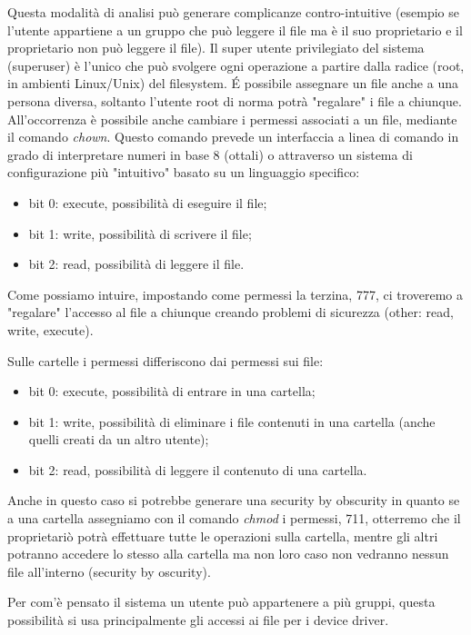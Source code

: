 Questa modalità di analisi può generare complicanze contro-intuitive (esempio se l’utente appartiene a un gruppo che può leggere il file ma è il suo proprietario e il proprietario non può leggere il file).
Il super utente privilegiato del sistema (superuser) è l'unico che può svolgere ogni operazione a partire dalla radice (root, in ambienti Linux/Unix) del filesystem.
\'E possibile assegnare un file anche a una persona diversa, soltanto l'utente root di norma potrà "regalare" i file a chiunque.
All'occorrenza è possibile anche cambiare i permessi associati a un file, mediante il comando \textit{chown}. Questo comando prevede un interfaccia a linea di comando in grado di interpretare numeri in base 8 (ottali) o attraverso un sistema di configurazione più "intuitivo" basato su un linguaggio specifico:
\begin{itemize}
    \item bit 0: execute, possibilità di eseguire il file;
    \item bit 1: write, possibilità di scrivere il file;
    \item bit 2: read, possibilità di leggere il file.
\end{itemize}
Come possiamo intuire, impostando come permessi la terzina, 777, ci troveremo a "regalare" l'accesso al file a chiunque creando problemi di sicurezza (other: read, write, execute).

Sulle cartelle i permessi differiscono dai permessi sui file:
\begin{itemize}
    \item bit 0: execute, possibilità di entrare in una cartella;
    \item bit 1: write, possibilità di eliminare i file contenuti in una cartella (anche quelli creati da un altro utente);
    \item bit 2: read, possibilità di leggere il contenuto di una cartella.
\end{itemize}
Anche in questo caso si potrebbe generare una security by obscurity in quanto se a una cartella assegniamo con il comando \textit{chmod} i permessi, 711, otterremo che il proprietariò potrà effettuare tutte le operazioni sulla cartella, mentre gli altri potranno accedere lo stesso alla cartella ma non loro caso non vedranno nessun file all'interno (security by oscurity).

Per com'è pensato il sistema un utente può appartenere a più gruppi, questa possibilità si usa principalmente gli accessi ai file per i device driver.

